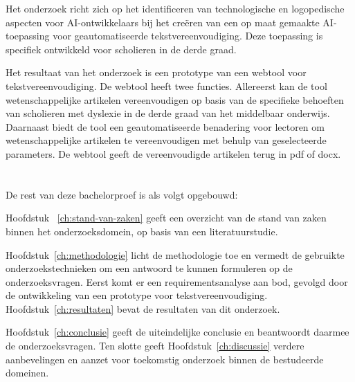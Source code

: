 Het onderzoek richt zich op het identificeren van technologische en logopedische aspecten voor AI-ontwikkelaars bij het creëren van een op maat gemaakte AI-toepassing voor geautomatiseerde tekstvereenvoudiging. Deze toepassing is specifiek ontwikkeld voor scholieren in de derde graad.

\medspace

Het resultaat van het onderzoek is een prototype van een webtool voor tekstvereenvoudiging. De webtool heeft twee functies. Allereerst kan de tool wetenschappelijke artikelen vereenvoudigen op basis van de specifieke behoeften van scholieren met dyslexie in de derde graad van het middelbaar onderwijs. Daarnaast biedt de tool een geautomatiseerde benadering voor lectoren om wetenschappelijke artikelen te vereenvoudigen met behulp van geselecteerde parameters. De webtool geeft de vereenvoudigde artikelen terug in pdf of docx. 

\section{}%
\label{sec:opzet-bachelorproef}

De rest van deze bachelorproef is als volgt opgebouwd:

Hoofdstuk ~\ref{ch:stand-van-zaken} geeft een overzicht van de stand van zaken binnen het onderzoeksdomein, op basis van een literatuurstudie.

Hoofdstuk~\ref{ch:methodologie} licht de methodologie toe en vermedt de gebruikte onderzoekstechnieken om een antwoord te kunnen formuleren op de onderzoeksvragen. Eerst komt er een requirementsanalyse aan bod, gevolgd door de ontwikkeling van een prototype voor tekstvereenvoudiging. Hoofdstuk~\ref{ch:resultaten} bevat de resultaten van dit onderzoek. 

Hoofdstuk~\ref{ch:conclusie} geeft de uiteindelijke conclusie en beantwoordt daarmee de onderzoeksvragen. Ten slotte geeft Hoofdstuk~\ref{ch:discussie} verdere aanbevelingen en aanzet voor toekomstig onderzoek binnen de bestudeerde domeinen. 